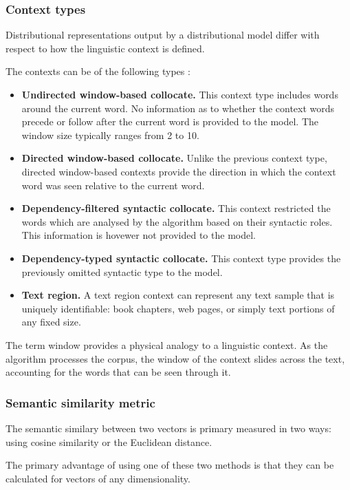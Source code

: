 \documentclass[14pt, a4paper]{extreport}
\begin{document}
\subsubsection{Context types}

Distributional representations output by a distributional model differ with respect to how the linguistic context is defined.

The contexts can be of the following types \parencite{lenci}:

\begin{itemize}
  \item \textbf{Undirected window-based collocate.} This context type includes words around the current word. No information as to whether the context words precede or follow after the current word is provided to the model. The window size typically ranges from 2 to 10.
  \item \textbf{Directed window-based collocate.} Unlike the previous context type, directed window-based contexts provide the direction in which the context word was seen relative to the current word.
  \item \textbf{Dependency-filtered syntactic collocate.} This context restricted the words which are analysed by the algorithm based on their syntactic roles. This information is hovewer not provided to the model.
  \item \textbf{Dependency-typed syntactic collocate.} This context type provides the previously omitted syntactic type to the model.
  \item \textbf{Text region.} A text region context can represent any text sample that is uniquely identifiable: book chapters, web pages, or simply text portions of any fixed size.
\end{itemize}

The term window provides a physical analogy to a linguistic context. As the algorithm processes the corpus, the window of the context slides across the text, accounting for the words that can be seen through it.

    \subsubsection{Semantic similarity metric}
The semantic similary between two vectors is primary measured in two ways: using cosine similarity or the Euclidean distance.

The primary advantage of using one of these two methods is that they can be calculated for vectors of any dimensionality.
\end{document}
